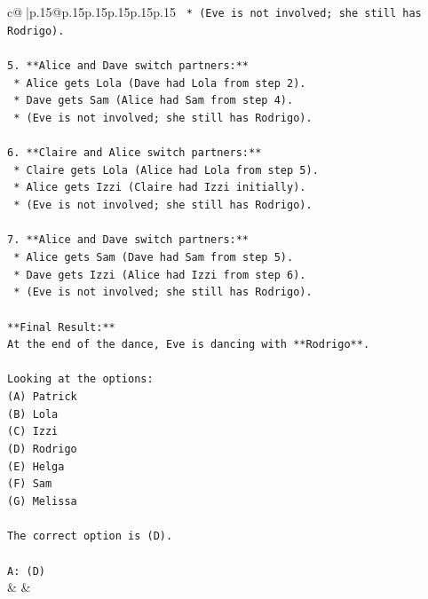 \documentclass{article}
\begin{document}
{\begin{supertabular}{c@{$\;$}|p{.15\linewidth}@{}p{.15\linewidth}p{.15\linewidth}p{.15\linewidth}p{.15\linewidth}p{.15\linewidth}}
{{{\texttt{    *   (Eve is not involved; she still has Rodrigo).} \\
\\ 
\texttt{5.  **Alice and Dave switch partners:**} \\
\texttt{    *   Alice gets Lola (Dave had Lola from step 2).} \\
\texttt{    *   Dave gets Sam (Alice had Sam from step 4).} \\
\texttt{    *   (Eve is not involved; she still has Rodrigo).} \\
\\ 
\texttt{6.  **Claire and Alice switch partners:**} \\
\texttt{    *   Claire gets Lola (Alice had Lola from step 5).} \\
\texttt{    *   Alice gets Izzi (Claire had Izzi initially).} \\
\texttt{    *   (Eve is not involved; she still has Rodrigo).} \\
\\ 
\texttt{7.  **Alice and Dave switch partners:**} \\
\texttt{    *   Alice gets Sam (Dave had Sam from step 5).} \\
\texttt{    *   Dave gets Izzi (Alice had Izzi from step 6).} \\
\texttt{    *   (Eve is not involved; she still has Rodrigo).} \\
\\ 
\texttt{**Final Result:**} \\
\texttt{At the end of the dance, Eve is dancing with **Rodrigo**.} \\
\\ 
\texttt{Looking at the options:} \\
\texttt{(A) Patrick} \\
\texttt{(B) Lola} \\
\texttt{(C) Izzi} \\
\texttt{(D) Rodrigo} \\
\texttt{(E) Helga} \\
\texttt{(F) Sam} \\
\texttt{(G) Melissa} \\
\\ 
\texttt{The correct option is (D).} \\
\\ 
\texttt{A: (D)} \\
            }
        }
    }
    & & \\ \\


\end{supertabular}}
\end{document}
